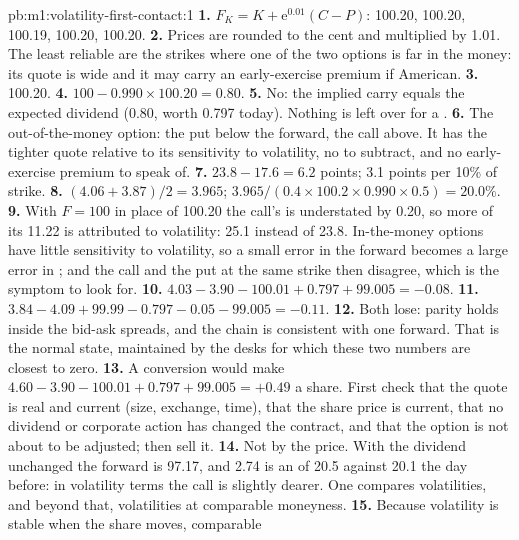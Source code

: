 \begin{solution}{pb:m1:volatility-first-contact:1}
\textbf{1.} $F_K = K + \mathrm{e}^{0.01}(C - P)$: 100.20, 100.20, 100.19,
100.20, 100.20.
\textbf{2.} Prices are rounded to the cent and multiplied by 1.01. The least
reliable are the strikes where one of the two options is far in the money:
its quote is wide and it may carry an early-exercise premium if American.
\textbf{3.} 100.20.
\textbf{4.} $100 - 0.990 \times 100.20 = 0.80$.
\textbf{5.} No: the implied carry equals the expected dividend (0.80, worth
0.797 today). Nothing is left over for a .
\textbf{6.} The out-of-the-money option: the put below the forward, the call
above. It has the tighter quote relative to its sensitivity to volatility,
no  to subtract, and no early-exercise premium to speak of.
\textbf{7.} $23.8 - 17.6 = 6.2$ points; 3.1 points per 10\% of strike.
\textbf{8.} $(4.06 + 3.87)/2 = 3.965$; $3.965/(0.4 \times 100.2 \times 0.990
\times 0.5) = 20.0\%$.
\textbf{9.} With $F = 100$ in place of 100.20 the call's  is
understated by 0.20, so more of its 11.22 is attributed to volatility: 25.1
instead of 23.8. In-the-money options have little sensitivity to volatility,
so a small error in the forward becomes a large error in ; and the call and the put at the same strike then disagree, which
is the symptom to look for.
\textbf{10.} $4.03 - 3.90 - 100.01 + 0.797 + 99.005 = -0.08$.
\textbf{11.} $3.84 - 4.09 + 99.99 - 0.797 - 0.05 - 99.005 = -0.11$.
\textbf{12.} Both lose: parity holds inside the bid-ask spreads, and the
chain is consistent with one forward. That is the normal state, maintained by
the desks for which these two numbers are closest to zero.
\textbf{13.} A conversion would make $4.60 - 3.90 - 100.01 + 0.797 + 99.005 =
+0.49$ a share. First check that the quote is real and current (size,
exchange, time), that the share price is current, that no dividend or
corporate action has changed the contract, and that the option is not about
to be adjusted; then sell it.
\textbf{14.} Not by the price. With the dividend unchanged the forward is
97.17, and 2.74 is an  of 20.5 against 20.1 the day before:
in volatility terms the call is slightly dearer. One compares volatilities,
and beyond that, volatilities at comparable moneyness.
\textbf{15.} Because volatility is stable when the share moves, comparable

\end{solution}
